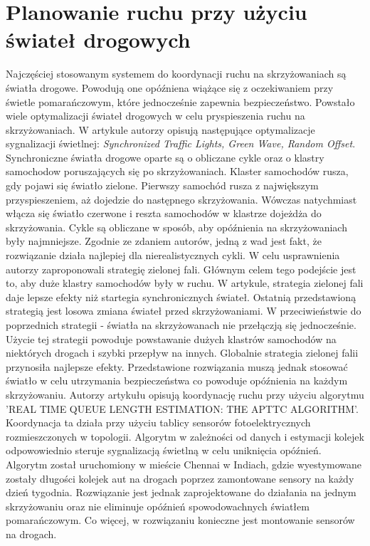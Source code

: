 \section{Planowanie ruchu przy użyciu świateł drogowych}

\indent
Najczęściej stosowanym systemem do koordynacji ruchu na skrzyżowaniach są światła drogowe. Powodują one opóźniena wiążące się z oczekiwaniem przy świetle pomarańczowym, które jednocześnie zapewnia bezpieczeństwo. Powstało wiele optymalizacji świateł drogowych w celu pryspieszenia ruchu na skrzyżowaniach.
\newline
\indent
W artykule \cite{brockfeld2001optimizing} autorzy opisują następujące optymalizacje sygnalizacji świetlnej: \textit{Synchronized Traffic Lights, Green Wave, Random Offset}. Synchroniczne światła drogowe oparte są o obliczane cykle oraz o klastry samochodow poruszających się po skrzyżowaniach. Klaster samochodów rusza, gdy pojawi się światło zielone. Pierwszy samochód rusza z największym przyspieszeniem, aż dojedzie do następnego skrzyżowania. Wówczas natychmiast włącza się światło czerwone i reszta samochodów w klastrze dojeżdża do skrzyżowania. Cykle są obliczane w sposób, aby opóźnienia na skrzyżowaniach były najmniejsze. Zgodnie ze zdaniem autorów, jedną z wad jest fakt, że rozwiązanie działa najlepiej dla nierealistycznych cykli. W celu usprawnienia autorzy zaproponowali strategię zielonej fali. Głównym celem tego podejście jest to, aby duże klastry samochodów były w ruchu. W artykule, strategia zielonej fali daje lepsze efekty niż startegia synchronicznych świateł. Ostatnią przedstawioną strategią jest losowa zmiana świateł przed skrzyżowaniami. W przeciwieństwie do poprzednich strategii - światła na skrzyżowanach nie przełączją się jednocześnie. Użycie tej strategii powoduje powstawanie dużych klastrów samochodów na niektórych drogach i szybki przepływ na innych. Globalnie strategia zielonej falii przynosiła najlepsze efekty. Przedstawione rozwiązania muszą jednak stosować światło w celu utrzymania bezpieczeństwa co powoduje opóźnienia na każdym skrzyżowaniu.
\newline
\indent
Autorzy artykułu \cite{athmaraman2005adaptive} opisują koordynację ruchu przy użyciu algorytmu 'REAL TIME QUEUE LENGTH ESTIMATION: THE APTTC ALGORITHM'. Koordynacja ta działa przy użyciu tablicy sensorów fotoelektrycznych rozmieszczonych w topologii. Algorytm w zależności od danych i estymacji kolejek odpowowiednio steruje sygnalizacją świetlną w celu uniknięcia opóźnień. Algorytm został uruchomiony w mieście Chennai w Indiach, gdzie wyestymowane zostały długości kolejek aut na drogach poprzez zamontowane sensory na każdy dzień tygodnia. Rozwiązanie jest jednak zaprojektowane do działania na jednym skrzyżowaniu oraz nie eliminuje opóźnień spowodowachnych światłem pomarańczowym. Co więcej, w rozwiązaniu konieczne jest montowanie sensorów na drogach.
